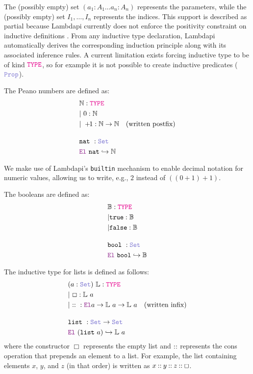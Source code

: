 The (possibly empty) set $(a_1 : A_1 \dots a_n : A_n)$ represents the parameters, while the (possibly empty) set $I_1, \dots, I_n$ represents the indices.
This support is described as partial because Lambdapi currently does not enforce the positivity constraint on inductive definitions \cite[\S 2.2]{inductive-type}.
From any inductive type declaration, Lambdapi automatically derives the corresponding induction principle along with its associated inference rules.
A current limitation exists forcing inductive type to be of kind $\type$, so for example it is not possible to create inductive predicates ($\prop$).


\begin{definition}[Natural]\label{def-nat}
The Peano numbers are defined as:
\begin{align*}
&\N \index{$\N$}: \type \\
&|~0 : \N \\
&|~+\!\!1: \N \ra \N \quad \text{(written postfix)} \\[1em]
& \kw{nat}~: \set \\
&  \el~\kw{nat} \re \N
\end{align*}
\end{definition}

We make use of Lambdapi's \lstinline[language=Lambdapi,basicstyle=\ttfamily\footnotesize]|builtin| mechanism to enable decimal notation for numeric values, allowing us to write, e.g., $2$ instead of $((0 +\!\!1) +\!\!1)$.

\begin{definition}[Boolean]\label{def-bool}
The booleans are defined as:
\begin{align*}
&\B \index{$\B$}: \type \\
&| \true \index{$\true$} : \B \\
&| \false \index{$\false$} : \B \\[1em]
& \kw{bool}\index{$\kw{bool}$}~: \set \\
&  \el~\kw{bool} \re \B
\end{align*}
\end{definition}

\begin{definition}[List]\label{def:list}
The inductive type for lists is defined as follows:
\begin{align*}
&(a: \set)~ \bb{L} \index{$\bb{L}$}: \type \\
&|~\Box \index{$\Box$}: \bb{L}~a \\
&|~\cons \index{$\cons$}~: \el  a \ra \bb{L}~a \ra \bb{L}~a \quad \text{(written infix)} \\[1em]
& \kw{list}\index{$\kw{list}$}~: \set \ra \set \\
&  \el~(\kw{list}~a) \re \bb{L}~a
\end{align*}
where the constructor $\Box$ represents the empty list and $\mathbin{::}$ represents the cons operation that prepends an element to a list.
For example, the list containing elements $x$, $y$, and $z$ (in that order) is written as $x \mathbin{::} y \mathbin{::} z \mathbin{::} \Box$.
\end{definition}


